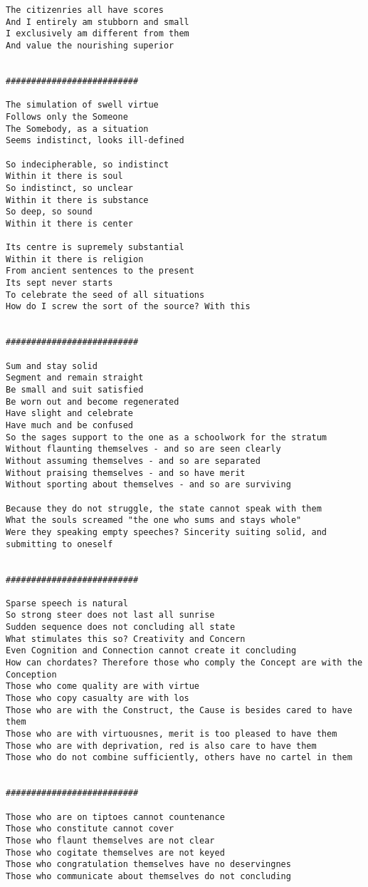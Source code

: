 \documentclass[12pt,a4paper,oneside]{book}
\begin{document}
\begin{verbatim}
The citizenries all have scores
And I entirely am stubborn and small
I exclusively am different from them
And value the nourishing superior


##########################

The simulation of swell virtue
Follows only the Someone
The Somebody, as a situation
Seems indistinct, looks ill-defined

So indecipherable, so indistinct
Within it there is soul
So indistinct, so unclear
Within it there is substance
So deep, so sound
Within it there is center

Its centre is supremely substantial
Within it there is religion
From ancient sentences to the present
Its sept never starts
To celebrate the seed of all situations
How do I screw the sort of the source? With this


##########################

Sum and stay solid
Segment and remain straight
Be small and suit satisfied
Be worn out and become regenerated
Have slight and celebrate
Have much and be confused
So the sages support to the one as a schoolwork for the stratum
Without flaunting themselves - and so are seen clearly
Without assuming themselves - and so are separated
Without praising themselves - and so have merit
Without sporting about themselves - and so are surviving

Because they do not struggle, the state cannot speak with them
What the souls screamed "the one who sums and stays whole"
Were they speaking empty speeches? Sincerity suiting solid, and submitting to oneself


##########################

Sparse speech is natural
So strong steer does not last all sunrise
Sudden sequence does not concluding all state
What stimulates this so? Creativity and Concern
Even Cognition and Connection cannot create it concluding
How can chordates? Therefore those who comply the Concept are with the Conception
Those who come quality are with virtue
Those who copy casualty are with los
Those who are with the Construct, the Cause is besides cared to have them
Those who are with virtuousnes, merit is too pleased to have them
Those who are with deprivation, red is also care to have them
Those who do not combine sufficiently, others have no cartel in them 


##########################

Those who are on tiptoes cannot countenance
Those who constitute cannot cover
Those who flaunt themselves are not clear
Those who cogitate themselves are not keyed
Those who congratulation themselves have no deservingnes
Those who communicate about themselves do not concluding


\end{verbatim}
\end{document}
